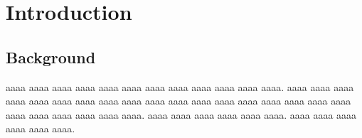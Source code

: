 \documentclass[12pt,openany,english]{jsbook}        %
\begin{document}
%
%
%
\chapter{Introduction}
%
%
%
\section{Background}
%
%
%
\begin{doublespace}
%
aaaa aaaa aaaa aaaa aaaa aaaa 
aaaa aaaa aaaa aaaa aaaa aaaa. 
aaaa aaaa aaaa aaaa aaaa aaaa 
aaaa aaaa aaaa aaaa aaaa aaaa 
aaaa aaaa aaaa aaaa aaaa aaaa 
aaaa aaaa aaaa aaaa aaaa aaaa. 
aaaa aaaa aaaa aaaa aaaa aaaa. 
aaaa aaaa aaaa aaaa aaaa aaaa. 
%
\end{doublespace}
%
%
%
\end{document}
